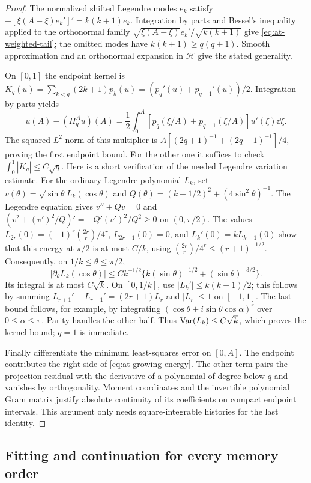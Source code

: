 \begin{proof}
The normalized shifted Legendre modes $e_k$ satisfy
$-[\xi(A-\xi)e_k']'=k(k+1)e_k$.
Integration by parts and Bessel's inequality applied to the orthonormal
family $\sqrt{\xi(A-\xi)}e_k'/\sqrt{k(k+1)}$ give
\eqref{eq:at-weighted-tail}; the omitted modes have $k(k+1)\ge q(q+1)$.
Smooth approximation and an orthonormal expansion in $\mathcal H$ give
the stated generality.

On $[0,1]$ the endpoint kernel is
$K_q(u)=\sum_{k<q}(2k+1)p_k(u)=(p_q'(u)+p_{q-1}'(u))/2$.
Integration by parts yields
\[
 u(A)-(\Pi_q^Au)(A)
 =\frac12\int_0^A[p_q(\xi/A)+p_{q-1}(\xi/A)]u'(\xi)\dd\xi.
\]
The squared $L^2$ norm of this multiplier is
$A[(2q+1)^{-1}+(2q-1)^{-1}]/4$, proving the first endpoint bound.
For the other one it suffices to check $\int_0^1|K_q|\le C\sqrt q$.
Here is a short verification of the needed Legendre variation estimate.
For the ordinary Legendre polynomial $L_k$, set
$v(\theta)=\sqrt{\sin\theta}L_k(\cos\theta)$ and
$Q(\theta)=(k+1/2)^2+(4\sin^2\theta)^{-1}$.
The Legendre equation gives $v''+Qv=0$ and
$(v^2+(v')^2/Q)'=-Q'(v')^2/Q^2\ge0$ on $(0,\pi/2)$.
The values $L_{2r}(0)=(-1)^r\binom{2r}{r}/4^r$,
$L_{2r+1}(0)=0$, and $L_k'(0)=kL_{k-1}(0)$ show that this energy
at $\pi/2$ is at most $C/k$, using
$\binom{2r}{r}/4^r\le(r+1)^{-1/2}$.
Consequently, on $1/k\le\theta\le\pi/2$,
\[
 |\partial_\theta L_k(\cos\theta)|
 \le Ck^{-1/2}\{k(\sin\theta)^{-1/2}+(\sin\theta)^{-3/2}\}.
\]
Its integral is at most $C\sqrt k$.  On $[0,1/k]$, use
$|L_k'|\le k(k+1)/2$; this follows by summing
$L_{r+1}'-L_{r-1}'=(2r+1)L_r$ and $|L_r|\le1$ on $[-1,1]$.
The last bound follows, for example, by integrating
$(\cos\theta+i\sin\theta\cos\alpha)^r$ over $0\le\alpha\le\pi$.
Parity handles the other half.  Thus ${\rm Var}(L_k)\le C\sqrt k$,
which proves the kernel bound; $q=1$ is immediate.

Finally differentiate the minimum least-squares error on $[0,A]$.
The endpoint contributes the right side of \eqref{eq:at-growing-energy}.
The other term pairs the projection residual with the derivative of a
polynomial of degree below $q$ and vanishes by orthogonality.  Moment
coordinates and the invertible polynomial Gram matrix justify absolute
continuity of its coefficients on compact endpoint intervals.  This
argument only needs square-integrable histories for the last identity.
\end{proof}

\subsection{Fitting and continuation for every memory order}
\label{sec:at-fitting}

